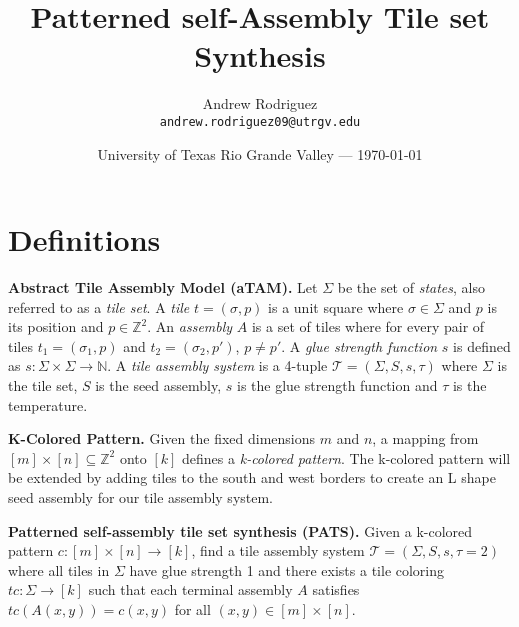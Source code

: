 \documentclass{article}
\title{Patterned self-Assembly Tile set Synthesis}
\author{Andrew Rodriguez\\ \texttt{andrew.rodriguez09@utrgv.edu}} %
\date{University of Texas Rio Grande Valley --- \today} %
\newcommand{\Z}{\mathbb{Z}}
\newcommand{\Tau}{\mathcal{T}}
\newcommand{\N}{\mathbb{N}}
\begin{document}
\maketitle %

\section{Definitions}

\textbf{Abstract Tile Assembly Model (aTAM).}
Let $\Sigma$ be the set of \emph{states}, also referred to as a \emph{tile set}. A \emph{tile} $t=(\sigma, p)$ is a unit square where $\sigma \in \Sigma$ and $p$ is its position and $p \in \Z^2$. An \emph{assembly} $A$ is a set of tiles where for every pair of tiles $t_1 = (\sigma_1, p)$ and $t_2 = (\sigma_2, p')$, $p \ne p'$. A \emph{glue strength function} $s$ is defined as $s: \Sigma \times \Sigma \rightarrow \N$. A \emph{tile assembly system} is a 4-tuple $\Tau = (\Sigma, S, s, \tau)$ where $\Sigma$ is the tile set, $S$ is the seed assembly, $s$ is the glue strength function and $\tau$ is the temperature.

\vspace{5mm}
\noindent
\textbf{K-Colored Pattern.}
Given the fixed dimensions $m$ and $n$, a mapping from $[m] \times [n] \subseteq \Z^2$ onto $[k]$ defines a \emph{k-colored pattern}. The k-colored pattern will be extended by adding tiles to the south and west borders to create an L shape seed assembly for our tile assembly system.

\vspace{5mm}
\noindent
\textbf{Patterned self-assembly tile set synthesis (PATS).}
Given a k-colored pattern $c: [m] \times [n] \rightarrow [k]$, find a tile assembly system $\Tau = (\Sigma, S, s, \tau=2)$ where all tiles in $\Sigma$ have glue strength 1 and there exists a tile coloring $tc: \Sigma \rightarrow [k]$ such that each terminal assembly $A$ satisfies $tc(A(x,y)) = c(x,y)$ for all $(x,y) \in [m] \times [n]$.
\end{document}
